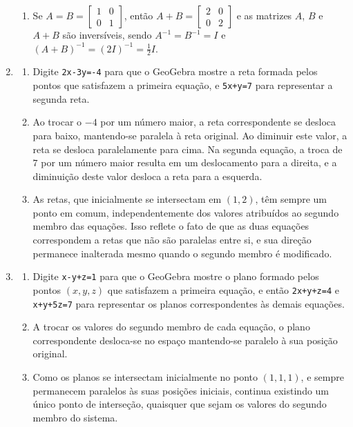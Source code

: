 \documentclass[12pt,a4paper]{article}
\begin{document}
\begin{enumerate}
\begin{enumerate}
\item Se
$A = B = \begin{bmatrix}
1 & 0 \\
0 & 1
\end{bmatrix}$, então
$A + B
= \begin{bmatrix}
2 & 0 \\
0 & 2
\end{bmatrix}$ e as matrizes $A$, $B$ e $A+B$ são inversíveis, sendo  $A^{-1} = B^{-1} = I$ e $(A+B)^{-1} = (2I)^{-1} = \frac{1}{2} I$.
\end{enumerate}

\item \begin{enumerate}
\item Digite \texttt{2x-3y=-4} para que o GeoGebra mostre a reta formada pelos pontos que satisfazem a primeira equação, e \texttt{5x+y=7} para representar a segunda reta.
\item Ao trocar o $-4$ por um número maior, a reta correspondente se desloca para baixo, mantendo-se paralela à reta original. Ao diminuir este valor, a reta se desloca paralelamente para cima. Na segunda equação, a troca de $7$ por um número maior resulta em um deslocamento para a direita, e a diminuição deste valor desloca a reta para a esquerda.

\item As retas, que inicialmente se intersectam em $(1,2)$, têm sempre um ponto em comum, independentemente dos valores atribuídos ao segundo membro das equações. Isso reflete o fato de que as duas equações correspondem a retas que não são paralelas entre si, e sua direção permanece inalterada mesmo quando o segundo membro é modificado.
\end{enumerate}


\item 
\begin{enumerate}
\item Digite \texttt{x-y+z=1} para que o GeoGebra mostre o plano formado pelos pontos $(x,y,z)$ que satisfazem a primeira equação, e então \texttt{2x+y+z=4} e \texttt{x+y+5z=7} para representar os planos correspondentes às demais equações.
\item A trocar os valores do segundo membro de cada equação, o plano correspondente desloca-se no espaço mantendo-se paralelo à sua posição original.

\item Como os planos se intersectam inicialmente no ponto $(1,1,1)$, e sempre permanecem paralelos às suas posições iniciais, continua existindo um único ponto de interseção, quaisquer que sejam os valores do segundo membro do sistema.
\end{enumerate}


\end{enumerate}
\end{document}
